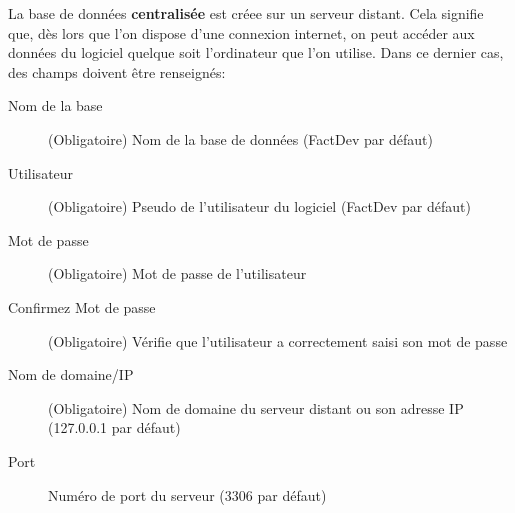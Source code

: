 La base de donn\'ees \textbf{centralis\'ee} est cr\'eee sur un serveur distant. Cela signifie que, d\`es lors que l'on dispose d'une connexion internet, on peut acc\'eder aux donn\'ees du logiciel quelque soit l'ordinateur que l'on utilise. 
Dans ce dernier cas, des champs doivent \^etre renseign\'es: \\
\begin{description}
	\item[Nom de la base] (Obligatoire) Nom de la base de donn\'ees (FactDev par d\'efaut)
	\item[Utilisateur] (Obligatoire) Pseudo de l'utilisateur du logiciel (FactDev par d\'efaut)
	\item[Mot de passe] (Obligatoire) Mot de passe de l'utilisateur
	\item[Confirmez Mot de passe] (Obligatoire) V\'erifie que l'utilisateur a correctement saisi son mot de passe
	\item[Nom de domaine/IP] (Obligatoire) Nom de domaine du serveur distant ou son adresse IP (127.0.0.1 par d\'efaut)
	\item[Port] Num\'ero de port du serveur (3306 par d\'efaut)
\end{description} 

